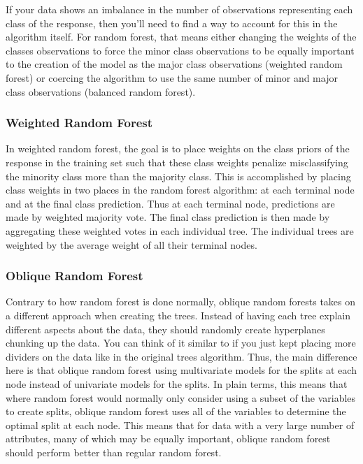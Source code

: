 \documentclass[a4paper]{article}
\begin{document}

If your data shows an imbalance in the number of observations representing each class of the response, then you'll need to find a way to account for this in the algorithm itself. For random forest, that means either changing the weights of the classes observations to force the minor class observations to be equally important to the creation of the model as the major class observations (weighted random forest) or coercing the algorithm to use the same number of minor and major class observations (balanced random forest).

\subsubsection{Weighted Random Forest}


In weighted random forest, the goal is to place weights on the class priors of the response in the training set such that these class weights penalize misclassifying the minority class more than the majority class. This is accomplished by placing class weights in two places in the random forest algorithm: at each terminal node and at the final class prediction. Thus at each terminal node, predictions are made by weighted majority vote. The final class prediction is then made by aggregating these weighted votes in each individual tree. The individual trees are weighted by the average weight of all their terminal nodes.%


\subsubsection{Oblique Random Forest}
Contrary to how random forest is done normally, oblique random forests takes on a different approach when creating the trees. Instead of having each tree explain different aspects about the data, they should randomly create hyperplanes chunking up the data. You can think of it similar to if you just kept placing more dividers on the data like in the original trees algorithm. Thus, the main difference here is that oblique random forest using multivariate models for the splits at each node instead of univariate models for the splits. In plain terms, this means that where random forest would normally only consider using a subset of the variables to create splits, oblique random forest uses all of the variables to determine the optimal split at each node. This means that for data with a very large number of attributes, many of which may be equally important, oblique random forest should perform better than regular random forest.
\end{document}
